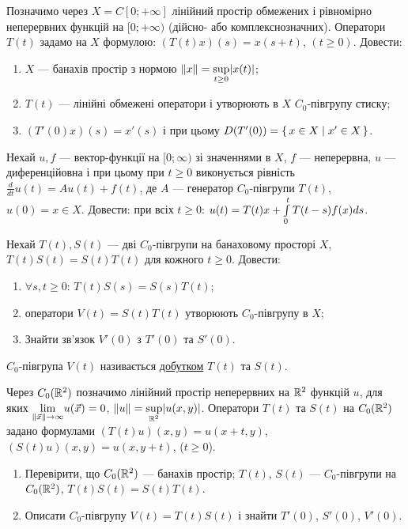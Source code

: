 \begin{exercise}
    Позначимо через $X = C[0;+\infty]$ лінійний простір обмежених і рівномірно неперервних
    функцій на $[0;+\infty)$ (дійсно- або комплекснозначних). Оператори $T(t)$ задамо на $X$
    формулою: $(T(t)x)(s) = x(s+t)$, $(t \geq 0)$. Довести:
    \begin{enumerate}
        \item $X$ --- банахів простір з нормою $\left\lVert x\right\rVert = \underset{t \geq 0}{\sup} |x(t)|$;
        \item $T(t)$ --- лінійні обмежені оператори і утворюють в $X$ $C_0$-півгрупу стиску;
        \item $(T'(0)x)(s) = x'(s)$ і при цьому $D(T'(0)) = \set{x\in X \mid x' \in X}$.
    \end{enumerate}
\end{exercise}

\begin{exercise}
    Нехай $u, f$ --- вектор-функції на $[0; \infty)$ зі значеннями в $X$,
    $f$ --- неперервна, $u$ --- диференційовна і при цьому при $t \geq 0$ виконується рівність
    $\frac{d}{dt}u(t) = A u(t) +f(t)$, де $A$ --- генератор $C_0$-півгрупи $T(t)$, $u(0) = x \in X$.
    Довести: при всіх $t \geq 0$: $u(t) = T(t)x +\int\limits_{0}^{t} T(t-s)f(x) ds$.
\end{exercise}

\begin{exercise}
    Нехай $T(t), S(t)$ --- дві $C_0$-півгрупи на банаховому просторі $X$, $T(t)S(t) = S(t)T(t)$
    для кожного $t \geq 0$. Довести:
    \begin{enumerate}
        \item $\forall s,t \geq 0$: $T(t)S(s) = S(s)T(t)$;
        \item оператори $V(t) = S(t)T(t)$ утворюють $C_0$-півгрупу в $X$;
        \item Знайти зв'язок $V'(0)$ з $T'(0)$ та $S'(0)$.
    \end{enumerate}
\end{exercise}

\begin{theory}
    $C_0$-півгрупа $V(t)$ називається \ul{добутком} $T(t)$ та $S(t)$.
\end{theory}

\begin{exercise}
    Через $C_0 (\mathbb{R}^2)$ позначимо лінійний простір неперервних на $\mathbb{R}^2$ функцій $u$,
    для яких $\underset{\left\lVert\vec{x}\right\rVert\to \infty}{\lim} u(\vec{x}) = 0$,
    $\left\lVert u\right\rVert = \underset{\mathbb{R}^2}{\sup} |u(x,y)|$. Оператори $T(t)$ та $S(t)$ на $C_0 (\mathbb{R}^2)$
    задано формулами $(T(t)u)(x,y) = u(x+t, y)$, $(S(t)u)(x,y) = u(x, y+t)$, ($t\geq 0$).
    \begin{enumerate}
        \item Перевірити, що $C_0 (\mathbb{R}^2)$ --- банахів простір; $T(t)$, $S(t)$ --- $C_0$-півгрупи на
        $C_0 (\mathbb{R}^2)$, $T(t)S(t) = S(t)T(t)$.
        \item Описати $C_0$-півгрупу $V(t) = T(t)S(t)$ і знайти $T'(0)$, $S'(0)$, $V'(0)$.
    \end{enumerate}
\end{exercise}